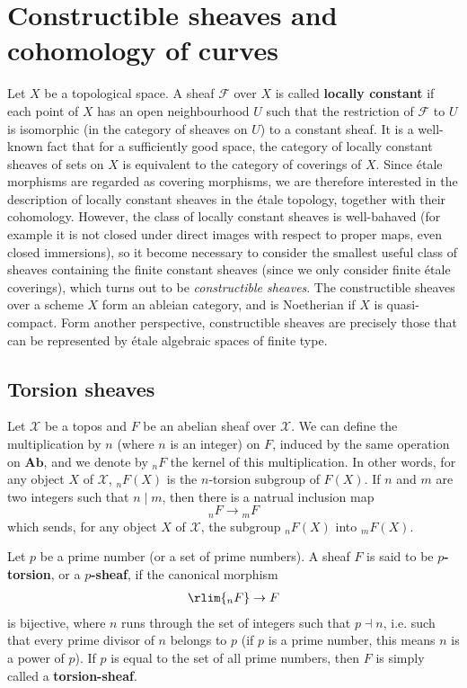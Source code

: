\section{Constructible sheaves and cohomology of curves}
Let $X$ be a topological space. A sheaf $\mathscr{F}$ over $X$ is called \textbf{locally constant} if each point of $X$ has an open neighbourhood $U$ such that the restriction of $\mathscr{F}$ to $U$ is isomorphic (in the category of sheaves on $U$) to a constant sheaf. It is a well-known fact that for a sufficiently good space, the category of locally constant sheaves of sets on $X$ is equivalent to the category of coverings of $X$. Since \'etale morphisms are regarded as covering morphisms, we are therefore interested in the description of locally constant sheaves in the \'etale topology, together with their cohomology. However, the class of locally constant sheaves is well-bahaved (for example it is not closed under direct images with respect to proper maps, even closed immersions), so it become necessary to consider the smallest useful class of sheaves containing the finite constant sheaves (since we only consider finite \'etale coverings), which turns out to be \textit{constructible sheaves}. The constructible sheaves over a scheme $X$ form an ableian category, and is Noetherian if $X$ is quasi-compact. Form another perspective, constructible sheaves are precisely those that can be represented by \'etale algebraic spaces of finite type.

\subsection{Torsion sheaves}
Let $\mathcal{X}$ be a topos and $F$ be an abelian sheaf over $\mathcal{X}$. We can define the multiplication by $n$ (where $n$ is an integer) on $F$, induced by the same operation on $\mathbf{Ab}$, and we denote by ${_nF}$ the kernel of this multiplication. In other words, for any object $X$ of $\mathcal{X}$, ${_nF}(X)$ is the $n$-torsion subgroup of $F(X)$. If $n$ and $m$ are two integers such that $n\mid m$, then there is a natrual inclusion map
\[{_nF}\to {_mF}\]
which sends, for any object $X$ of $\mathcal{X}$, the subgroup ${_nF}(X)$ into ${_mF}(X)$.

\begin{definition}
Let $p$ be a prime number (or a set of prime numbers). A sheaf $F$ is said to be \textbf{$p$-torsion}, or a \textbf{$p$-sheaf}, if the canonical morphism
\begin{align}\label{topos torsion abelian sheaf def}
\rlim {_nF}\to F
\end{align}
is bijective, where $n$ runs through the set of integers such that $p\dashv n$, i.e. such that every prime divisor of $n$ belongs to $p$ (if $p$ is a prime number, this means $n$ is a power of $p$). If $p$ is equal to the set of all prime numbers, then $F$ is simply called a \textbf{torsion-sheaf}.
\end{definition}

